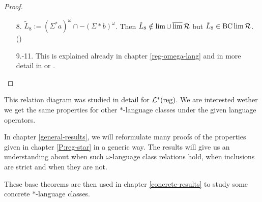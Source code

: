 \begin{lemma}
\begin{proof}
\begin{enumerate}
\item[8.]
$\tilde{L}_8 := (\Sigma^*a)^\omega \cap -(\Sigma*b)^\omega$. Then $\tilde{L}_8 \notin \lim \cup \operatorname{\overline{lim}} \mathcal{R}$ but $\tilde{L}_8 \in \operatorname{BC} \lim \mathcal{R}$. (\cite[prop, p.38]{InfCompR101})

\item[9.-11.]
This is explained already in chapter \ref{reg-omega-lang} and in more detail in \cite{InfCompR101} or \cite[Theorem 3.1]{CombR107}.

\end{enumerate}
\end{proof}
\end{lemma}


This relation diagram was studied in detail for $\mathcal{L}^*(\text{reg})$. We are interested wether we get the same properties for other $*$-language classes under the given language operators.


In chapter \ref{general-results}, we will reformulate many proofs of the properties given in chapter \ref{P:reg-star} in a generic way. The results will give us an understanding about when such $\omega$-language class relations hold, when inclusions are strict and when they are not.

These base theorems are then used in chapter \ref{concrete-results} to study some concrete $*$-language classes.

